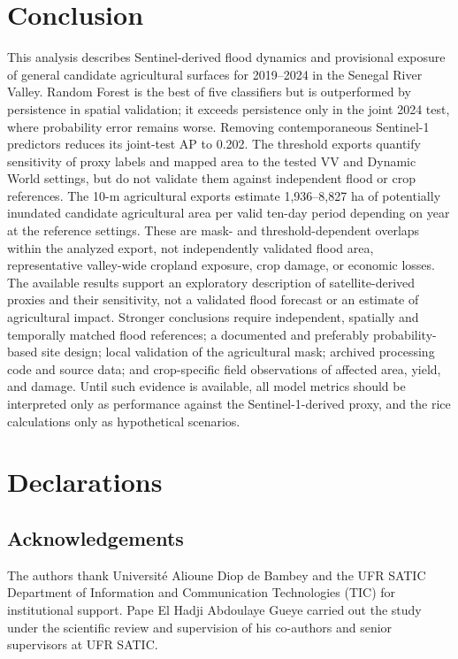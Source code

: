 \documentclass[pdflatex,sn-mathphys,Numbered]{sn-jnl}
\begin{document}
\section{Conclusion}
This analysis describes Sentinel-derived flood dynamics and provisional exposure of general candidate agricultural surfaces for 2019--2024 in the Senegal River Valley. Random Forest is the best of five classifiers but is outperformed by persistence in spatial validation; it exceeds persistence only in the joint 2024 test, where probability error remains worse. Removing contemporaneous Sentinel-1 predictors reduces its joint-test AP to 0.202. The threshold exports quantify sensitivity of proxy labels and mapped area to the tested VV and Dynamic World settings, but do not validate them against independent flood or crop references. The 10-m agricultural exports estimate 1,936--8,827 ha of potentially inundated candidate agricultural area per valid ten-day period depending on year at the reference settings. These are mask- and threshold-dependent overlaps within the analyzed export, not independently validated flood area, representative valley-wide cropland exposure, crop damage, or economic losses. The available results support an exploratory description of satellite-derived proxies and their sensitivity, not a validated flood forecast or an estimate of agricultural impact. Stronger conclusions require independent, spatially and temporally matched flood references; a documented and preferably probability-based site design; local validation of the agricultural mask; archived processing code and source data; and crop-specific field observations of affected area, yield, and damage. Until such evidence is available, all model metrics should be interpreted only as performance against the Sentinel-1-derived proxy, and the rice calculations only as hypothetical scenarios.

\backmatter

\section*{Declarations}
\subsection*{Acknowledgements}
The authors thank Universit\'e Alioune Diop de Bambey and the UFR SATIC Department of Information and Communication Technologies (TIC) for institutional support. Pape El Hadji Abdoulaye Gueye carried out the study under the scientific review and supervision of his co-authors and senior supervisors at UFR SATIC.
\end{document}
